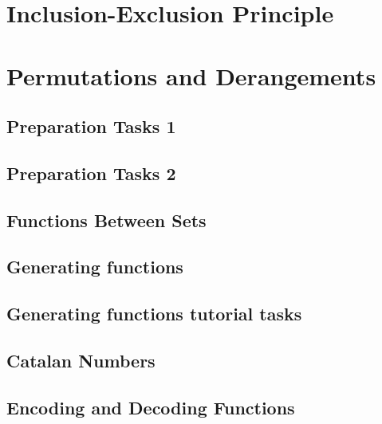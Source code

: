 \documentclass{article}
\newcommand{\includelectureSub}[1]{%
  \begingroup
    \renewcommand{\section}{\subsection}%
  \endgroup
}
\newcommand{\includelectureNoHeader}[1]{%
  \begingroup
    \let\maketitle\relax%
  \endgroup
}
\begin{document}
\section{Inclusion-Exclusion Principle}
\includelectureNoHeader{Inclusion_Exclusion}

\section{Permutations and Derangements}
\includelectureSub{Permutations_Derangements}

\section{Preparation Tasks 1}
\includelectureSub{Preparation_tasks1}

\section{Preparation Tasks 2}
\includelectureSub{Preparation_tasks2}

\section{Functions Between Sets}
\includelectureNoHeader{Functions_between_sets}

\section{Generating functions}
\includelectureSub{Generating_functions}

\section{Generating functions tutorial tasks}
\includelectureSub{Generating_functions_tutorial}

\section{Catalan Numbers}
\includelectureSub{Catalan_Numbers}

\section{Encoding and Decoding Functions}
\includelectureSub{Codes}
\end{document}
